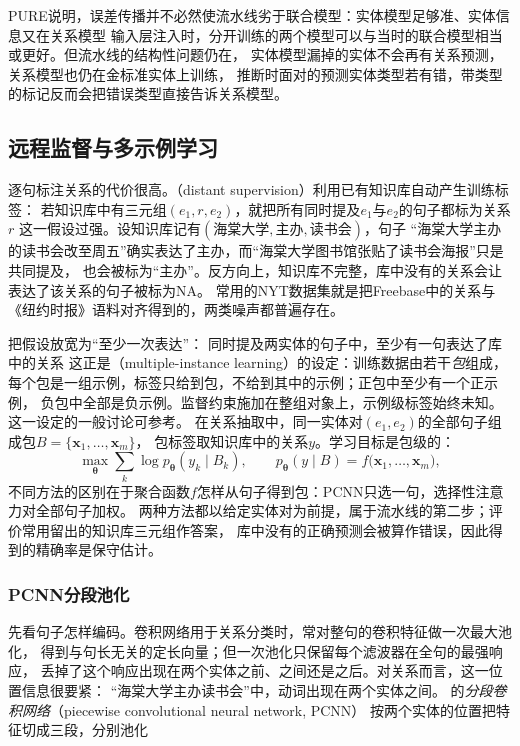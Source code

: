 PURE说明，误差传播并不必然使流水线劣于联合模型：实体模型足够准、实体信息又在关系模型
输入层注入时，分开训练的两个模型可以与当时的联合模型相当或更好。但流水线的结构性问题仍在，
实体模型漏掉的实体不会再有关系预测，关系模型也仍在金标准实体上训练，
推断时面对的预测实体类型若有错，带类型的标记反而会把错误类型直接告诉关系模型。

\subsection{远程监督与多示例学习}
\label{sec:nlp-extraction-distant}

逐句标注关系的代价很高。（distant supervision）利用已有知识库自动产生训练标签：
若知识库中有三元组$(e_1,r,e_2)$，就把所有同时提及$e_1$与$e_2$的句子都标为关系$r$
这一假设过强。设知识库记有$(\text{海棠大学},\text{主办},\text{读书会})$，句子
“海棠大学主办的读书会改至周五”确实表达了主办，而“海棠大学图书馆张贴了读书会海报”只是共同提及，
也会被标为“主办”。反方向上，知识库不完整，库中没有的关系会让表达了该关系的句子被标为NA。
常用的NYT数据集就是把Freebase中的关系与《纽约时报》语料对齐得到的\cite{knowledge-acquisition-riedel2010}，两类噪声都普遍存在。

\citeauthor{knowledge-acquisition-riedel2010}把假设放宽为“至少一次表达”：
同时提及两实体的句子中，至少有一句表达了库中的关系
这正是（multiple-instance learning）的设定：训练数据由若干\emph{包}组成，
每个包是一组示例，标签只给到包，不给到其中的示例；正包中至少有一个正示例，
负包中全部是负示例。监督约束施加在整组对象上，示例级标签始终未知。
这一设定的一般讨论可参考。
在关系抽取中，同一实体对$(e_1,e_2)$的全部句子组成包$B=\{\bm{x}_1,\ldots,\bm{x}_m\}$，
包标签取知识库中的关系$y$。学习目标是包级的：
\[
  \max_{\bm{\theta}}\sum_{k}\log p_{\bm{\theta}}(y_k\mid B_k),\qquad
  p_{\bm{\theta}}(y\mid B)=f\bigl(\bm{x}_1,\ldots,\bm{x}_m\bigr),
\]
不同方法的区别在于聚合函数$f$怎样从句子得到包：PCNN只选一句，选择性注意力对全部句子加权。
两种方法都以给定实体对为前提，属于流水线的第二步；评价常用留出的知识库三元组作答案，
库中没有的正确预测会被算作错误，因此得到的精确率是保守估计。

\subsubsection{PCNN分段池化}
\label{sec:nlp-extraction-pcnn}

先看句子怎样编码。卷积网络用于关系分类时，常对整句的卷积特征做一次最大池化，
得到与句长无关的定长向量；但一次池化只保留每个滤波器在全句的最强响应，
丢掉了这个响应出现在两个实体之前、之间还是之后。对关系而言，这一位置信息很要紧：
“海棠大学主办读书会”中，动词出现在两个实体之间。
\citeauthor{zeng2015pcnn}的\emph{分段卷积网络}（piecewise convolutional neural network, PCNN）
按两个实体的位置把特征切成三段，分别池化

